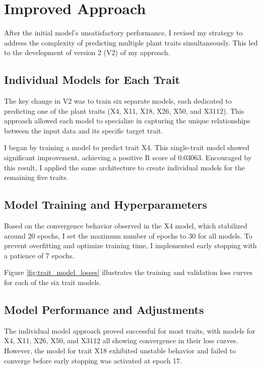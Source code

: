 \documentclass{article}
\begin{document}
\section{Improved Approach}

After the initial model's unsatisfactory performance, I revised my strategy to address the complexity of predicting multiple plant traits simultaneously. This led to the development of version 2 (V2) of my approach.

\subsection{Individual Models for Each Trait}

The key change in V2 was to train six separate models, each dedicated to predicting one of the plant traits (X4, X11, X18, X26, X50, and X3112). This approach allowed each model to specialize in capturing the unique relationships between the input data and its specific target trait.

I began by training a model to predict trait X4. This single-trait model showed significant improvement, achieving a positive R score of 0.03063. Encouraged by this result, I applied the same architecture to create individual models for the remaining five traits.

\subsection{Model Training and Hyperparameters}

Based on the convergence behavior observed in the X4 model, which stabilized around 20 epochs, I set the maximum number of epochs to 30 for all models. To prevent overfitting and optimize training time, I implemented early stopping with a patience of 7 epochs.

Figure \ref{fig:trait_model_losses} illustrates the training and validation loss curves for each of the six trait models.

\subsection{Model Performance and Adjustments}

The individual model approach proved successful for most traits, with models for X4, X11, X26, X50, and X3112 all showing convergence in their loss curves. However, the model for trait X18 exhibited unstable behavior and failed to converge before early stopping was activated at epoch 17.
\end{document}
